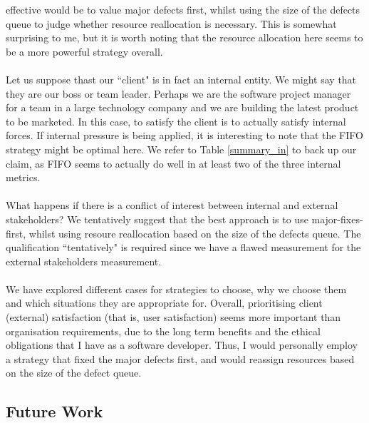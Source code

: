 effective would be to value major defects first, whilst using the size of the
defects queue to judge whether resource reallocation is necessary.
This is somewhat surprising to me, but it is worth noting that the resource
allocation here seems to be a more powerful strategy overall.\\
\\
Let us suppose thast our ``client" is in fact an internal entity.
We might say that they are our boss or team leader.
Perhaps we are the software project manager for a team in a large technology
company and we are building the latest product to be marketed.
In this case, to satisfy the client is to actually satisfy internal forces.
If internal pressure is being applied, it is interesting to note that the FIFO
strategy might be optimal here.
We refer to Table \ref{summary_in} to back up our claim, as FIFO seems to
actually do well in at least two of the three internal metrics.\\
\\
What happens if there is a conflict of interest between internal and external
stakeholders?
We tentatively suggest that the best approach is to use major-fixes-first,
   whilst using resoure reallocation based on the size of the defects queue.
The qualification ``tentatively" is required since we have a flawed measurement
for the external stakeholders measurement.\\
\\
We have explored different cases for strategies to choose, why we choose them
and which situations they are appropriate for.
Overall, prioritising client (external) satisfaction (that is, user
    satisfaction) seems more important than organisation requirements, due to
the long term benefits and the ethical obligations that I have as a software
developer.
Thus, I would personally employ a strategy that fixed the major defects first,
  and would reassign resources based on the size of the defect queue.

\subsection{Future Work}

